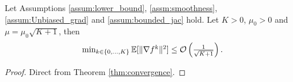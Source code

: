 \documentclass{article}
\begin{document}
\begin{corollary}
  \label{cor:convergence}%
 Let Assumptions \ref{assum:lower_bound},  \ref{assm:smoothness}, \ref{assum:Unbiased_grad} and \ref{assum:bounded_jac} hold. Let $K>0$,  $\mu_0 > 0$ and $\mu =\mu_0 {\sqrt{K+1}}$, then
\begin{eqnarray*}
 \textstyle 
\min_{k \in \{0,\ldots,K\}}\mathbb{E}[\|\nabla f^k\|^2] \leq {\cal O} \left(\tfrac{1}{\sqrt{K+1}}\right).
\end{eqnarray*}
\end{corollary}
\begin{proof}
Direct from Theorem \ref{thm:convergence}.
\end{proof}



\end{document}
